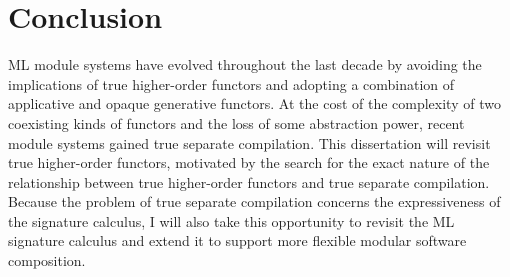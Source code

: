 \documentclass[12pt]{article}
\begin{document}

\section{Conclusion}
		ML module systems have evolved throughout the last decade by avoiding the implications of true higher-order functors and adopting a combination of applicative and opaque generative functors. At the cost of the complexity of two coexisting kinds of functors and the loss of some abstraction power, recent module systems gained true separate compilation. This dissertation will revisit true higher-order functors, motivated by the search for the exact nature of the relationship between true higher-order functors and true separate compilation. Because the problem of true separate compilation concerns the expressiveness of the signature calculus, I will also take this opportunity to revisit the ML signature calculus and extend it to support more flexible modular software composition. 
\end{document}
